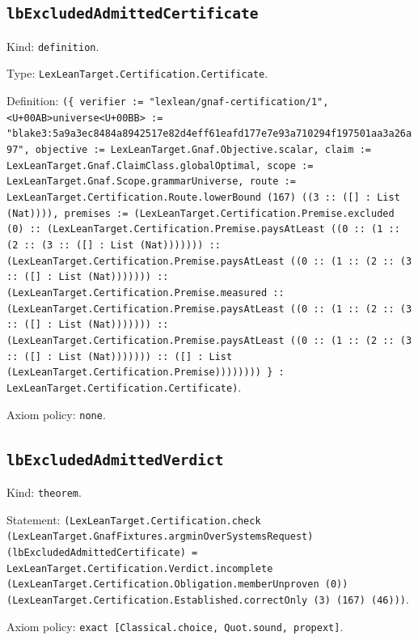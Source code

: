 \documentclass[11pt]{article}
\begin{document}
\subsection*{\texttt{lbExcludedAdmittedCertificate}}
\noindent Kind: \texttt{definition}.\par
\noindent Type: \texttt{LexLeanTarget.Certification.Certificate}.\par
\noindent Definition: \texttt{(\{ verifier := "lexlean/gnaf-certification/1", <U+00AB>universe<U+00BB> := "blake3:5a9a3ec8484a8942517e82d4eff61eafd177e7e93a710294f197501aa3a26a97", objective := LexLeanTarget.Gnaf.Objective.scalar, claim := LexLeanTarget.Gnaf.ClaimClass.globalOptimal, scope := LexLeanTarget.Gnaf.Scope.grammarUniverse, route := LexLeanTarget.Certification.Route.lowerBound (167) ((3 :: ([] : List (Nat)))), premises := (LexLeanTarget.Certification.Premise.excluded (0) :: (LexLeanTarget.Certification.Premise.paysAtLeast ((0 :: (1 :: (2 :: (3 :: ([] : List (Nat))))))) :: (LexLeanTarget.Certification.Premise.paysAtLeast ((0 :: (1 :: (2 :: (3 :: ([] : List (Nat))))))) :: (LexLeanTarget.Certification.Premise.measured :: (LexLeanTarget.Certification.Premise.paysAtLeast ((0 :: (1 :: (2 :: (3 :: ([] : List (Nat))))))) :: (LexLeanTarget.Certification.Premise.paysAtLeast ((0 :: (1 :: (2 :: (3 :: ([] : List (Nat))))))) :: ([] : List (LexLeanTarget.Certification.Premise)))))))) \} : LexLeanTarget.Certification.Certificate)}.\par
\noindent Axiom policy: \texttt{none}.\par
\subsection*{\texttt{lbExcludedAdmittedVerdict}}
\noindent Kind: \texttt{theorem}.\par
\noindent Statement: \texttt{(LexLeanTarget.Certification.check (LexLeanTarget.GnafFixtures.argminOverSystemsRequest) (lbExcludedAdmittedCertificate) = LexLeanTarget.Certification.Verdict.incomplete (LexLeanTarget.Certification.Obligation.memberUnproven (0)) (LexLeanTarget.Certification.Established.correctOnly (3) (167) (46)))}.\par
\noindent Axiom policy: \texttt{exact [Classical.choice, Quot.sound, propext]}.\par
\end{document}
